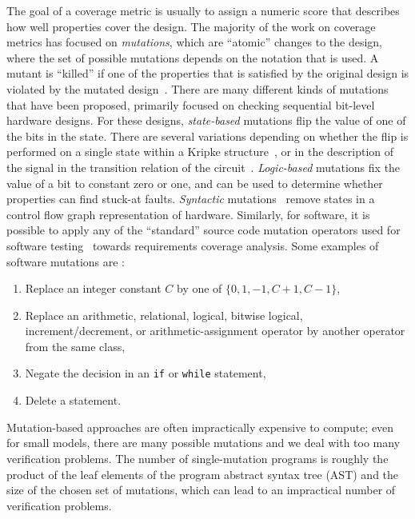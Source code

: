 The goal of a coverage metric is usually to assign a numeric score that describes how well properties cover the design. The majority of the work on coverage metrics has focused on {\em mutations}, which are ``atomic'' changes to the design, where the set of possible mutations depends on the notation that is used.  A mutant is ``killed'' if one of the properties that is satisfied by the original design is violated by the mutated design~\cite{chockler_coverage_2003,chockler2001practical,chockler2010coverage,Kupferman:2006:SCF,kupferman_theory_2008}.  There are many different kinds of mutations that have been proposed, primarily focused on checking sequential bit-level hardware designs.  For these designs, {\em state-based} mutations flip the value of one of the bits in the state.  There are several variations depending on whether the flip is performed on a single state within a Kripke structure~\cite{hoskote1999coverage}, or in the description of the signal in the transition relation of the circuit~\cite{chockler2001practical}.  {\em Logic-based} mutations fix the value of a bit to constant zero or one, and can be used to determine whether properties can find stuck-at faults.  {\em Syntactic} mutations~\cite{chockler_coverage_2003} remove states in a control flow graph representation of hardware.  Similarly, for software, it is possible to apply any of the ``standard'' source code mutation operators used for software testing~\cite{Andrews06:mutation} towards requirements coverage analysis.  Some examples of software mutations are \cite{Budd:1980}:
\begin{enumerate}
    \item Replace an integer constant $C$ by one of $\{0, 1, -1, C + 1, C - 1\}$,
    \item Replace an arithmetic, relational, logical, bitwise logical, increment/decrement, or arithmetic-assignment operator by another operator from the same class,
    \item Negate the decision in an \texttt{if} or \texttt{while} statement,
    \item Delete a statement.
\end{enumerate}

Mutation-based approaches are often impractically expensive to compute; even for small models, there are many possible mutations and we deal with too many verification problems.  The number of single-mutation programs is roughly the product of the leaf elements of the program abstract syntax tree (AST) and the size of the chosen set of mutations, which can lead to an impractical number of verification problems.

